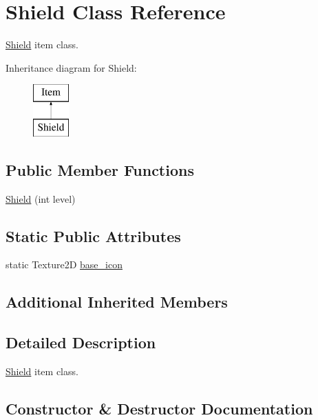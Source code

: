 \hypertarget{class_shield}{}\section{Shield Class Reference}
\label{class_shield}


\mbox{\hyperlink{class_shield}{Shield}} item class.  


Inheritance diagram for Shield\+:\begin{figure}[H]
\begin{center}
\leavevmode
\includegraphics[height=2.000000cm]{class_shield}
\end{center}
\end{figure}
\subsection*{Public Member Functions}
\begin{DoxyCompactItemize}
\item 
\mbox{\hyperlink{class_shield_a5bd67f14c9a8202223629d8dce2cb9f2}{Shield}} (int level)
\end{DoxyCompactItemize}
\subsection*{Static Public Attributes}
\begin{DoxyCompactItemize}
\item 
static Texture2D \mbox{\hyperlink{class_shield_ad5d63280a29e5ddd4a42d34533372e33}{base\+\_\+icon}}
\end{DoxyCompactItemize}
\subsection*{Additional Inherited Members}


\subsection{Detailed Description}
\mbox{\hyperlink{class_shield}{Shield}} item class. 

\subsection{Constructor \& Destructor Documentation}
\mbox{\label{class_shield_a5bd67f14c9a8202223629d8dce2cb9f2}} 
